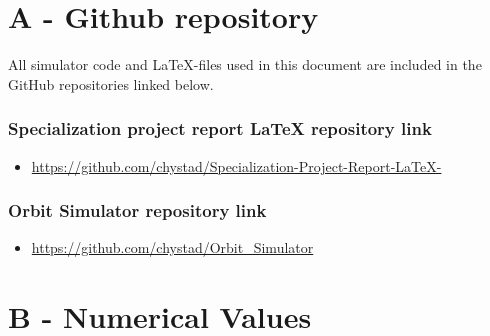 

\chapter*{A - Github repository}

All simulator code and LaTeX-files used in this document are included in the GitHub repositories linked below. 

\subsection*{Specialization project report LaTeX repository link}
\begin{itemize}
    \item \url{https://github.com/chystad/Specialization-Project-Report-LaTeX-}
\end{itemize}


\subsection*{Orbit Simulator repository link}
\begin{itemize}
    \item \url{https://github.com/chystad/Orbit_Simulator}
\end{itemize}






\chapter*{B - Numerical Values}

